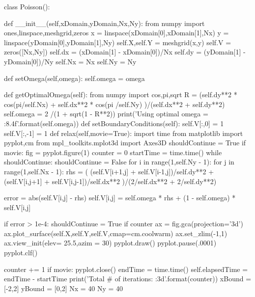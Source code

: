 \begin{codeexample}
\begin{VerbatimOut}{\listingFile}


class Poisson():

    def __init__(self,xDomain,yDomain,Nx,Ny):
        from numpy import ones,linspace,meshgrid,zeros
        x = linspace(xDomain[0],xDomain[1],Nx)
        y = linspace(yDomain[0],yDomain[1],Ny)
        self.X,self.Y = meshgrid(x,y)
        self.V = zeros([Nx,Ny])
        self.dx = (xDomain[1] - xDomain[0])/Nx
        self.dy = (yDomain[1] - yDomain[0])/Ny
        self.Nx = Nx
        self.Ny = Ny

    def setOmega(self,omega):
        self.omega = omega

    def getOptimalOmega(self):
        from numpy import cos,pi,sqrt
        R = (self.dy**2 * cos(pi/self.Nx) + self.dx**2 * cos(pi /self.Ny) )/(self.dx**2 + self.dy**2)
        self.omega = 2 /(1 + sqrt(1 - R**2))
        print('Using optimal omega = {:8.4f}'.format(self.omega))
    def setBoundaryConditions(self):
        self.V[:,0] = 1
        self.V[:,-1] = 1
    def relax(self,movie=True):
        import time
        from matplotlib import pyplot,cm
        from mpl_toolkits.mplot3d import Axes3D
        shouldContinue = True
        if movie:
            fig = pyplot.figure(1)
        counter = 0
        startTime = time.time()
        while shouldContinue:
            shouldContinue = False
            for i in range(1,self.Ny - 1):
                for j in range(1,self.Nx - 1):
                    rhs =  ( (self.V[i+1,j] + self.V[i-1,j])/self.dy**2 + (self.V[i,j+1] + self.V[i,j-1])/self.dx**2   )/(2/self.dx**2 + 2/self.dy**2)

                    error = abs(self.V[i,j] - rhs)
                    self.V[i,j] = self.omega * rhs + (1 - self.omega) * self.V[i,j]

                    if error > 1e-4:
                        shouldContinue = True
            if counter %
                ax = fig.gca(projection='3d')
                ax.plot_surface(self.X,self.Y,self.V,cmap=cm.coolwarm)
                ax.set_zlim(-1,1)
                ax.view_init(elev= 25.5,azim = 30)
                pyplot.draw()
                pyplot.pause(.0001)
                pyplot.clf()

            counter += 1
        if movie:
            pyplot.close()
        endTime = time.time()
        self.elapsedTime = endTime - startTime
        print('Total # of iterations: {:3d}'.format(counter))
xBound = [-2,2]
yBound = [0,2]
Nx = 40
Ny = 40


\end{VerbatimOut}
\end{codeexample}
